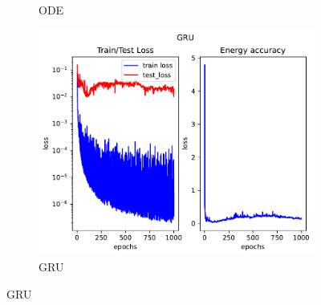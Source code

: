 \begin{figure}[H]
\begin{subfigure}[b]{0.3\textwidth}
		\caption{ODE}
	\end{subfigure}
	\hfill
	\begin{subfigure}[b]{0.3\textwidth}
		\centering
		\includegraphics[width=\textwidth]{chapters/chapter5/body3_gru_loss.pdf}
		\caption{GRU}
	\end{subfigure}
	
	\vspace{0.5cm} %
	

\end{figure}
